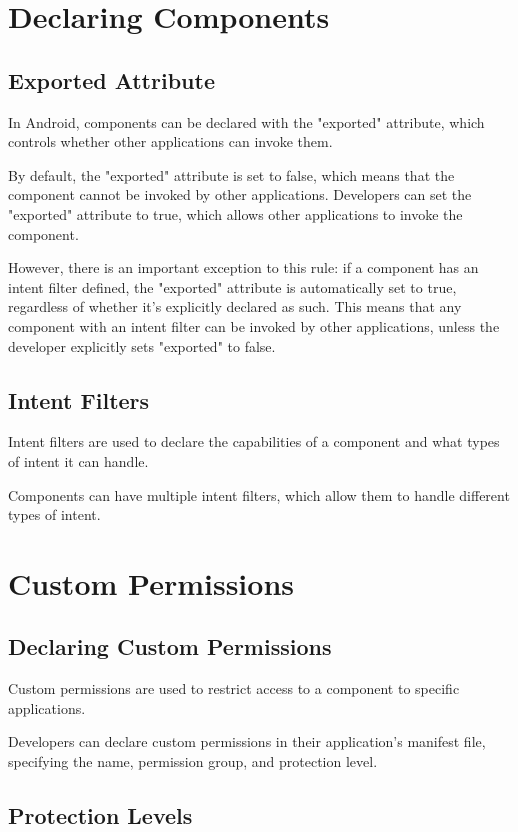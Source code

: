 \documentclass{article}
\begin{document}
\section{Declaring Components}
\subsection{Exported Attribute}

In Android, components can be declared with the "exported" attribute, which controls whether other applications can invoke them.

By default, the "exported" attribute is set to false, which means that the component cannot be invoked by other applications. Developers can set the "exported" attribute to true, which allows other applications to invoke the component.

However, there is an important exception to this rule: if a component has an intent filter defined, the "exported" attribute is automatically set to true, regardless of whether it's explicitly declared as such. This means that any component with an intent filter can be invoked by other applications, unless the developer explicitly sets "exported" to false.

\subsection{Intent Filters}

Intent filters are used to declare the capabilities of a component and what types of intent it can handle.

Components can have multiple intent filters, which allow them to handle different types of intent.

\section{Custom Permissions}
\subsection{Declaring Custom Permissions}

Custom permissions are used to restrict access to a component to specific applications.

Developers can declare custom permissions in their application's manifest file, specifying the name, permission group, and protection level.

\subsection{Protection Levels}
\end{document}
